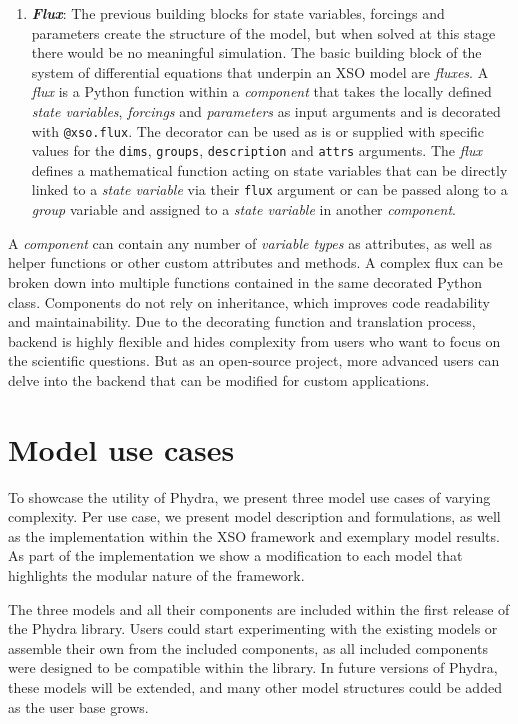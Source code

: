 \documentclass[journal abbreviation, manuscript]{copernicus}
\begin{document}
\begin{enumerate}
    \item \textbf{\textit{Flux}}: 
    The previous building blocks for state variables, forcings and parameters create the structure of the model, but when solved at this stage there would be no meaningful simulation. The basic building block of the system of differential equations that underpin an XSO model are \textit{fluxes}. A \textit{flux} is a Python function within a \textit{component} that takes the locally defined \textit{state variables}, \textit{forcings} and \textit{parameters} as input arguments and is decorated with \texttt{@xso.flux}. The decorator can be used as is or supplied with specific values for the \texttt{dims}, \texttt{groups}, \texttt{description} and \texttt{attrs} arguments. The \textit{flux} defines a mathematical function acting on state variables that can be directly linked to a \textit{state variable} via their \texttt{flux} argument or can be passed along to a \textit{group} variable and assigned to a \textit{state variable} in another \textit{component}.

    
\end{enumerate}

A \textit{component} can contain any number of \textit{variable types} as attributes, as well as helper functions or other custom attributes and methods. A complex flux can be broken down into multiple functions contained in the same decorated Python class. Components do not rely on inheritance, which improves code readability and maintainability. Due to the decorating function and translation process, backend is highly flexible and hides complexity from users who want to focus on the scientific questions. But as an open-source project, more advanced users can delve into the backend that can be modified for custom applications.


\section{Model use cases} \label{Section:UseCases}

To showcase the utility of Phydra, we present three model use cases of varying complexity. Per use case, we present model description and formulations, as well as the implementation within the XSO framework and exemplary model results. As part of the implementation we show a modification to each model that highlights the modular nature of the framework.

The three models and all their components are included within the first release of the Phydra library. Users could start experimenting with the existing models or assemble their own from the included components, as all included components were designed to be compatible within the library. In future versions of Phydra, these models will be extended, and many other model structures could be added as the user base grows.
\end{document}
